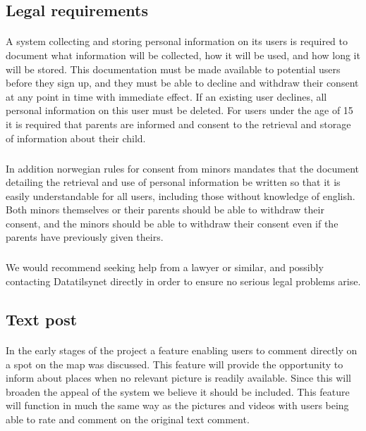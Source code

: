 \subsection{Legal requirements}
\label{subsec:FurtherRequiredLegal}

\paragraph{} A system collecting and storing personal information on its users is required to document what information will be collected, how it will be used, and how long it will be stored. This documentation must be made available to potential users before they sign up, and they must be able to decline and withdraw their consent at any point in time with immediate effect. If an existing user declines, all personal information on this user must be deleted. For users under the age of 15 it is required that parents are informed and consent to the retrieval and storage of information about their child.
\subparagraph{} In addition norwegian rules for consent from minors mandates that the document detailing the retrieval and use of personal information be written so that it is easily understandable for all users, including those without knowledge of english. Both minors themselves or their parents should be able to withdraw their consent, and the minors should be able to withdraw their consent even if the parents have previously given theirs.
\subparagraph{} We would recommend seeking help from a lawyer or similar, and possibly contacting Datatilsynet directly in order to ensure no serious legal problems arise.

\subsection{Text post}
\label{subsec:FurtherRequiredTextPost}

\paragraph{} In the early stages of the project a feature enabling users to comment directly on a spot on the map was discussed. This feature will provide the opportunity to inform about places when no relevant picture is readily available. Since this will broaden the appeal of the system we believe it should be included. This feature will function in much the same way as the pictures and videos with users being able to rate and comment on the original text comment.

